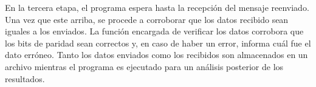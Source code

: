 	En la tercera etapa, el programa espera hasta la recepción del mensaje reenviado. Una vez que este arriba, se procede a corroborar que los datos recibido sean iguales a los enviados.	La función encargada de verificar los datos corrobora que los bits de paridad sean correctos y, en caso de haber un error, informa cuál fue el dato erróneo.
	Tanto los datos enviados como los recibidos son almacenados en un archivo mientras el programa es ejecutado para un análisis posterior de los resultados.
	
%	
%		
%	
